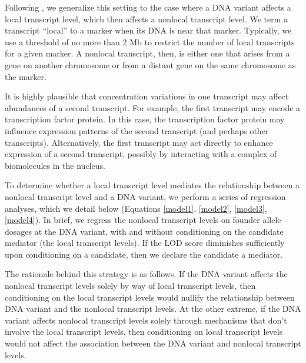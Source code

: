 \documentclass[oneside]{book}
\begin{document}
Following \citet{keller2018genetic}, we generalize this setting to the case where a DNA variant affects a local transcript level, which then affects a nonlocal transcript level. We term a transcript ``local'' to a marker when its DNA is near that marker. Typically, we use a threshold of no more than 2 Mb to restrict the number of local transcripts for a given marker. A nonlocal transcript, then, is either one that arises from a gene on another chromosome or from a distant gene on the same chromosome as the marker.

It is highly plausible that concentration variations in one transcript may affect abundances of a second transcript. For example, the first transcript may encode a transcription factor protein. In this case, the transcription factor protein may influence expression patterns of the second transcript (and perhaps other transcripts). Alternatively, the first transcript may act directly to enhance expression of a second transcript, possibly by interacting with a complex of biomolecules in the nucleus.





To determine whether a local transcript level mediates the relationship between a nonlocal transcript level and a DNA variant, we perform a series of regression analyses, which we detail below (Equations \ref{model1}, \ref{model2}, \ref{model3}, \ref{model4}). In brief, we regress the nonlocal transcript levels on founder allele dosages at the DNA variant, with and without conditioning on the candidate mediator (the local transcript levels). If the LOD score diminishes sufficiently upon conditioning on a candidate, then we declare the candidate a mediator.

The rationale behind this strategy is as follows. If the DNA variant affects the nonlocal transcript levels solely by way of local transcript levels, then conditioning on the local transcript levels would nullify the relationship between DNA variant and the nonlocal transcript levels. At the other extreme, if the DNA variant affects nonlocal transcript levels solely through mechanisms that don't involve the local transcript levels, then conditioning on local transcript levels would not affect the association between the DNA variant and nonlocal transcript levels.
\end{document}
